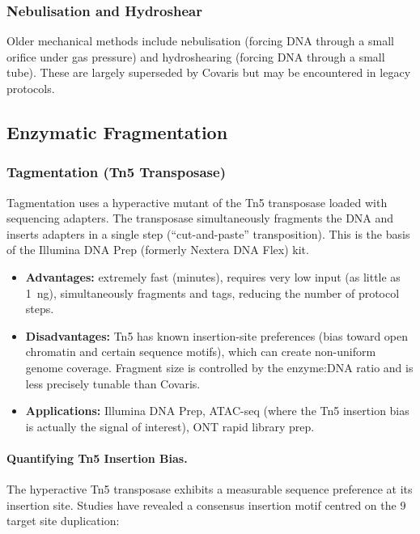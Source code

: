 \subsubsection{Nebulisation and Hydroshear}

Older mechanical methods include nebulisation (forcing DNA through a small orifice under gas pressure) and hydroshearing (forcing DNA through a small tube). These are largely superseded by Covaris but may be encountered in legacy protocols.

\subsection{Enzymatic Fragmentation}

\subsubsection{Tagmentation (Tn5 Transposase)}

Tagmentation uses a hyperactive mutant of the Tn5 transposase loaded with sequencing adapters. The transposase simultaneously fragments the DNA and inserts adapters in a single step (``cut-and-paste'' transposition). This is the basis of the Illumina DNA Prep (formerly Nextera DNA Flex) kit.

\begin{itemize}[nosep]
  \item \textbf{Advantages:} extremely fast (minutes), requires very low input (as little as 1~ng), simultaneously fragments and tags, reducing the number of protocol steps.
  \item \textbf{Disadvantages:} Tn5 has known insertion-site preferences (bias toward open chromatin and certain sequence motifs), which can create non-uniform genome coverage. Fragment size is controlled by the enzyme:DNA ratio and is less precisely tunable than Covaris.
  \item \textbf{Applications:} Illumina DNA Prep, ATAC-seq (where the Tn5 insertion bias is actually the signal of interest), ONT rapid library prep.
\end{itemize}

\paragraph{Quantifying Tn5 Insertion Bias.}
\label{par:libprep:tn5-bias}

The hyperactive Tn5 transposase exhibits a measurable sequence preference at its insertion site. Studies have revealed a consensus insertion motif centred on the 9\basepair{} target site duplication:

